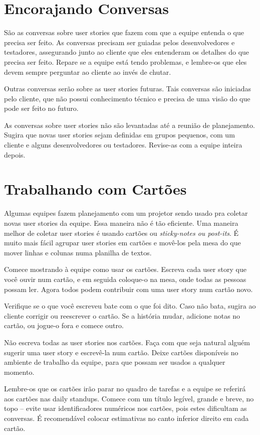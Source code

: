 \documentclass[a4paper, 10pt, font=plain]{abnt}
\begin{document}
\section{Encorajando Conversas}
São as conversas sobre user stories que fazem com que a equipe entenda o que precisa ser feito. As conversas precisam ser guiadas pelos desenvolvedores e testadores, assegurando junto ao cliente que eles entenderam os detalhes do que precisa ser feito. Repare se a equipe está tendo problemas, e lembre-os que eles devem sempre perguntar ao cliente ao invés de chutar.

Outras conversas serão sobre as user stories futuras. Tais conversas são iniciadas pelo cliente, que não possui conhecimento técnico e precisa de uma visão do que pode ser feito no futuro.

As conversas sobre user stories não são levantadas até a reunião de planejamento. Sugira que novas user stories sejam definidas em grupos pequenos, com um cliente e alguns desenvolvedores ou testadores. Revise-as com a equipe inteira depois.


\section{Trabalhando com Cartões}
Algumas equipes fazem planejamento com um projetor sendo usado pra coletar novas user stories da equipe. Essa maneira não é tão eficiente. Uma maneira melhor de coletar user stories é usando cartões ou \textit{sticky-notes ou post-its}. É muito mais fácil agrupar user stories em cartões e movê-los pela mesa do que mover linhas e colunas numa planilha de textos.

Comece mostrando à equipe como usar os cartões. Escreva cada user story que você ouvir num cartão, e em seguida coloque-o na mesa, onde todas as pessoas possam ler. Agora todos podem contribuir com uma user story num cartão novo.

Verifique se o que você escreveu bate com o que foi dito. Caso não bata, sugira ao cliente corrigir ou reescrever o cartão. Se a história mudar, adicione notas no cartão, ou jogue-o fora e comece outro.

Não escreva todas as user stories nos cartões. Faça com que seja natural alguém sugerir uma user story e escrevê-la num cartão. Deixe cartões disponíveis no ambiente de trabalho da equipe, para que possam ser usados a qualquer momento.

Lembre-os que os cartões irão parar no quadro de tarefas e a equipe se referirá aos cartões nas daily standups. Comece com um título legível, grande e breve, no topo -- evite usar identificadores numéricos nos cartões, pois estes dificultam as conversas. É recomendável colocar estimativas no canto inferior direito em cada cartão.
\end{document}

